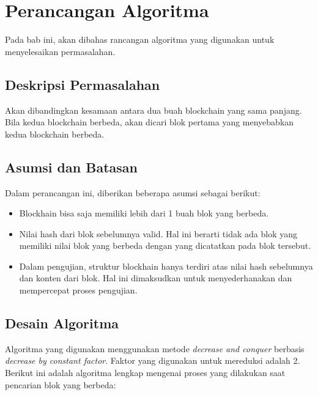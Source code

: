 \documentclass[10pt,conference]{IEEEtran}
\theoremstyle{definition}
\begin{document}
\section{Perancangan Algoritma}

Pada bab ini, akan dibahas rancangan algoritma yang digunakan untuk menyelesaikan permasalahan.

\subsection{Deskripsi Permasalahan}
Akan dibandingkan kesamaan antara dua buah blockchain yang sama panjang. Bila kedua blockchain berbeda, akan dicari blok pertama yang menyebabkan kedua blockchain berbeda. 

\subsection{Asumsi dan Batasan}
Dalam perancangan ini, diberikan beberapa asumsi sebagai berikut:
\begin{itemize}
    \item Blockhain bisa saja memiliki lebih dari 1 buah blok yang berbeda.
    \item Nilai hash dari blok sebelumnya valid. Hal ini berarti tidak ada blok yang memiliki nilai blok yang berbeda dengan yang dicatatkan pada blok tersebut.
    \item Dalam pengujian, struktur blockhain hanya terdiri atas nilai hash sebelumnya dan konten dari blok. Hal ini dimaksudkan untuk menyederhanakan dan mempercepat proses pengujian.
\end{itemize}

\subsection{Desain Algoritma}
Algoritma yang digunakan menggunakan metode \emph{decrease and conquer} berbasis \emph{decrease by constant factor}. Faktor yang  digunakan untuk mereduksi adalah 2. Berikut ini adalah algoritma lengkap mengenai proses yang dilakukan saat pencarian blok yang berbeda:
\end{document}
